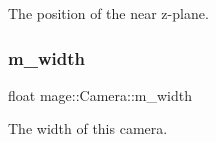 The position of the near z-\/plane. \hypertarget{classmage_1_1_camera_acc8f371214af02fdac9a1ff04508c4ca}{}\label{classmage_1_1_camera_acc8f371214af02fdac9a1ff04508c4ca} 
\subsubsection{\texorpdfstring{m\+\_\+width}{m\_width}}
{\footnotesize\ttfamily float mage\+::\+Camera\+::m\+\_\+width\hspace{0.3cm}{\ttfamily [protected]}}

The width of this camera. 